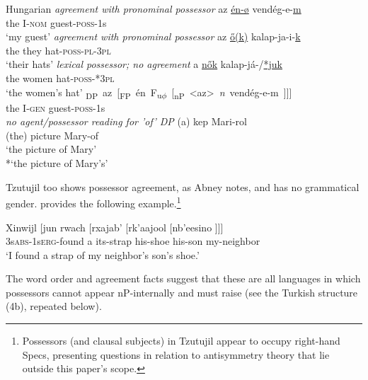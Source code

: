 \documentclass[output=paper
,modfonts
,nonflat]{langsci/langscibook}
\begin{document}
\begin{exe}
	\ex Hungarian \citep[90]{Szabolcsi1983}
	\xlist
		\ex \textit{agreement with pronominal possessor} \newline
	\gll az   \underline{én-ø} vendég-e-\underline{m}\\
	the I-\textsc{nom} guest-\textsc{poss}{}-1s\\
	\glt `my guest'  	
		\ex \textit{agreement with pronominal possessor} \newline
	\gll az   \underline{\H{o}(k)}  kalap-ja-i-\underline{k}\\
	the they hat-\textsc{poss}{}-\textsc{pl}{}-\textsc{3pl}\\
	\glt `their hats'
		\ex \textit{lexical possessor; no agreement}\newline
	\gll  a   \underline{n\H{o}k}       kalap-já-/\underline{*juk}\\
	the   women hat-\textsc{poss}{}-*\textsc{3pl}\\
	\glt `the women's hat' 
		\ex 
	\gll \mbox{{\lbrack}\textsubscript{DP} az [\textsubscript{FP} én    F\textsubscript{u}\textsubscript{$\phi$} [\textsubscript{nP} <az> \textit{n} vendég-e-m ]]]{\rbrack}}\\
	\hspace{0.6cm}the      \hspace{-5.4cm}I-\textsc{gen}                     \hspace{-2.7cm}guest-\textsc{poss}-1s\\
		\ex \textit{no agent/possessor reading for 'of' DP} \newline
	\gll (a) kep       Mari-rol\\
(the) picture Mary-of\\
	\glt `the picture of Mary'\\ {*}`the picture of Mary's'
	\endxlist
\end{exe}
Tzutujil too shows possessor agreement, as Abney notes, and has no grammatical gender. \citet[286]{Dayley1985} provides the following example.\footnote{Possessors (and clausal subjects) in Tzutujil appear to occupy right-hand Specs, presenting questions in relation to antisymmetry theory \citep{Kayne1994} that lie outside this paper’s scope.} 

\begin{exe}
	\ex 
	\gll Xinwijl [jun rwach [rxajab' [rk'aajool [nb'eesino ]]]{\rbrack}\\
	3s\textsc{abs}-1s\textsc{erg}-found     \hspace{0.1cm}a     its-strap    \hspace{0.1cm}his-shoe      \hspace{0.1cm}his-son    \hspace{0.1cm}my-neighbor\\
	\glt `I found a strap of my neighbor's son's shoe.'  	
\end{exe}
The word order and agreement facts suggest that these are all languages in which possessors cannot appear nP-internally and must raise (see the Turkish structure (4b), repeated below). 
\end{document}
